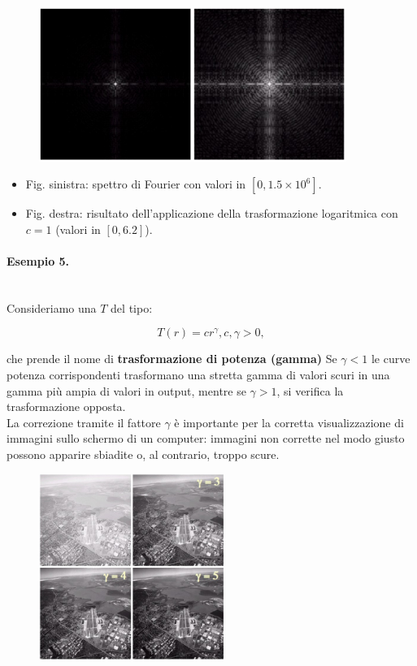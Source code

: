 \begin{figure}[H]
    \centering
    \includegraphics[width=10cm, keepaspectratio]{capitoli/immagini/imgs/trasformazione_logaritmica_esempio_4.jpg}
\end{figure}

\begin{itemize}
    \item Fig. sinistra: spettro di Fourier con valori in $[0, 1.5 \times 10^6]$.
    \item Fig. destra: risultato dell'applicazione della trasformazione logaritmica
          con $c = 1$ (valori in $[0, 6.2]$).
\end{itemize}

\paragraph{Esempio 5.}\ \\

Consideriamo una $T$ del tipo:

$$
    T(r) = cr^\gamma, c, \gamma > 0,
$$

che prende il nome di \textbf{trasformazione di potenza (gamma)}
Se $\gamma < 1$ le curve potenza corrispondenti trasformano una stretta
gamma di valori scuri in una gamma più ampia di valori in output,
mentre se $\gamma > 1$, si verifica la trasformazione opposta.\\
La correzione tramite il fattore $\gamma$ è importante per la corretta
visualizzazione di immagini sullo schermo di un computer:
immagini non corrette nel modo giusto possono apparire sbiadite o,
al contrario, troppo scure.

\begin{figure}[H]
    \centering
    \includegraphics[width=6cm, keepaspectratio]{capitoli/immagini/imgs/foto_esempio_5.jpg}
\end{figure}

